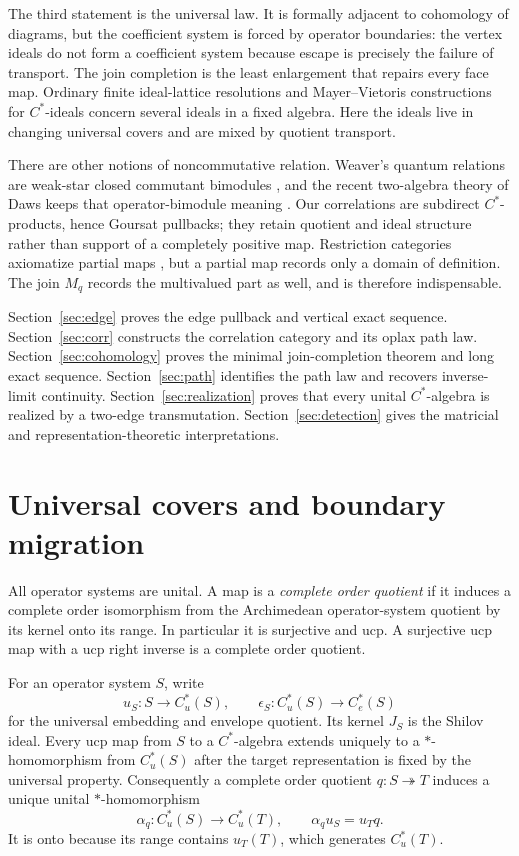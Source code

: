 \documentclass[11pt,a4paper]{amsart}
\theoremstyle{plain}
\theoremstyle{definition}
\newcommand{\Cu}{C_u^*}
\newcommand{\Ce}{C_e^*}
\begin{document}
The third statement is the universal law.  It is formally adjacent to cohomology of diagrams,
but the coefficient system is forced by operator boundaries: the vertex ideals do not form a
coefficient system because escape is precisely the failure of transport.  The join completion is
the least enlargement that repairs every face map.  Ordinary finite ideal-lattice resolutions
\cite{Maszczyk2009} and Mayer--Vietoris constructions for $C^*$-ideals
\cite{Naarmann2019} concern several ideals in a fixed algebra.  Here the ideals live in changing
universal covers and are mixed by quotient transport.

There are other notions of noncommutative relation.  Weaver's quantum relations are weak-star
closed commutant bimodules \cite{Weaver2012}, and the recent two-algebra theory of Daws keeps that
operator-bimodule meaning \cite{Daws2026}.  Our correlations are subdirect $C^*$-products, hence
Goursat pullbacks; they retain quotient and ideal structure rather than support of a completely
positive map.  Restriction categories axiomatize partial maps \cite{CockettLack2002}, but a partial
map records only a domain of definition.  The join $M_q$ records the multivalued part as well, and
is therefore indispensable.

Section~\ref{sec:edge} proves the edge pullback and vertical exact sequence.
Section~\ref{sec:corr} constructs the correlation category and its oplax path law.
Section~\ref{sec:cohomology} proves the minimal join-completion theorem and long exact sequence.
Section~\ref{sec:path} identifies the path law and recovers inverse-limit continuity.
Section~\ref{sec:realization} proves that every unital $C^*$-algebra is realized by a two-edge
transmutation.  Section~\ref{sec:detection} gives the matricial and representation-theoretic
interpretations.

\section{Universal covers and boundary migration}\label{sec:prelim}

All operator systems are unital.  A map is a \emph{complete order quotient} if it induces a
complete order isomorphism from the Archimedean operator-system quotient by its kernel onto its
range.  In particular it is surjective and ucp.  A surjective ucp map with a ucp right inverse is
a complete order quotient.

For an operator system $S$, write
\[
 u_S:S\longrightarrow\Cu(S),\qquad
 \epsilon_S:\Cu(S)\longrightarrow\Ce(S)
\]
for the universal embedding and envelope quotient.  Its kernel $J_S$ is the Shilov ideal.
Every ucp map from $S$ to a $C^*$-algebra extends uniquely to a $*$-homomorphism from
$\Cu(S)$ after the target representation is fixed by the universal property.  Consequently a
complete order quotient $q:S\twoheadrightarrow T$ induces a unique unital $*$-homomorphism
\[
 \alpha_q:\Cu(S)\longrightarrow\Cu(T),\qquad
 \alpha_q u_S=u_Tq.
\]
It is onto because its range contains $u_T(T)$, which generates $\Cu(T)$.
\end{document}
